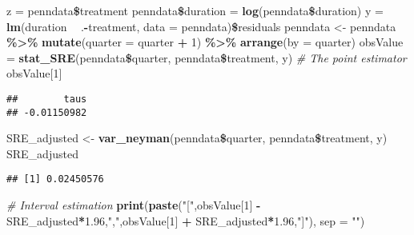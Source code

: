 \documentclass[]{article}
\newenvironment{Shaded}{\begin{snugshade}}{\end{snugshade}}
\newcommand{\KeywordTok}[1]{\textcolor[rgb]{0.13,0.29,0.53}{\textbf{#1}}}
\newcommand{\DataTypeTok}[1]{\textcolor[rgb]{0.13,0.29,0.53}{#1}}
\newcommand{\DecValTok}[1]{\textcolor[rgb]{0.00,0.00,0.81}{#1}}
\newcommand{\FloatTok}[1]{\textcolor[rgb]{0.00,0.00,0.81}{#1}}
\newcommand{\StringTok}[1]{\textcolor[rgb]{0.31,0.60,0.02}{#1}}
\newcommand{\CommentTok}[1]{\textcolor[rgb]{0.56,0.35,0.01}{\textit{#1}}}
\newcommand{\OperatorTok}[1]{\textcolor[rgb]{0.81,0.36,0.00}{\textbf{#1}}}
\newcommand{\NormalTok}[1]{#1}
\begin{document}
\begin{Shaded}
\begin{Highlighting}[]
\NormalTok{z =}\StringTok{ }\NormalTok{penndata}\OperatorTok{\$}\NormalTok{treatment}
\NormalTok{penndata}\OperatorTok{\$}\NormalTok{duration =}\StringTok{ }\KeywordTok{log}\NormalTok{(penndata}\OperatorTok{\$}\NormalTok{duration)}
\NormalTok{y =}\StringTok{ }\KeywordTok{lm}\NormalTok{(duration }\OperatorTok{~}\StringTok{ }\NormalTok{.}\OperatorTok{-}\NormalTok{treatment, }\DataTypeTok{data =}\NormalTok{ penndata)}\OperatorTok{\$}\NormalTok{residuals}
\NormalTok{penndata <-}\StringTok{ }\NormalTok{penndata }\OperatorTok{\%>\%}
\StringTok{  }\KeywordTok{mutate}\NormalTok{(}\DataTypeTok{quarter =}\NormalTok{ quarter }\OperatorTok{+}\StringTok{ }\DecValTok{1}\NormalTok{) }\OperatorTok{\%>\%}
\StringTok{  }\KeywordTok{arrange}\NormalTok{(}\DataTypeTok{by =}\NormalTok{ quarter)}
\NormalTok{obsValue =}\StringTok{ }\KeywordTok{stat_SRE}\NormalTok{(penndata}\OperatorTok{\$}\NormalTok{quarter, penndata}\OperatorTok{\$}\NormalTok{treatment, y)}
\CommentTok{# The point estimator}
\NormalTok{obsValue[}\DecValTok{1}\NormalTok{]}
\end{Highlighting}
\end{Shaded}

\begin{verbatim}
##        taus 
## -0.01150982
\end{verbatim}

\begin{Shaded}
\begin{Highlighting}[]
\NormalTok{SRE_adjusted <-}\StringTok{ }\KeywordTok{var_neyman}\NormalTok{(penndata}\OperatorTok{\$}\NormalTok{quarter, penndata}\OperatorTok{\$}\NormalTok{treatment, y)}
\NormalTok{SRE_adjusted}
\end{Highlighting}
\end{Shaded}

\begin{verbatim}
## [1] 0.02450576
\end{verbatim}

\begin{Shaded}
\begin{Highlighting}[]
\CommentTok{# Interval estimation}
\KeywordTok{print}\NormalTok{(}\KeywordTok{paste}\NormalTok{(}\StringTok{"["}\NormalTok{,obsValue[}\DecValTok{1}\NormalTok{] }\OperatorTok{-}\StringTok{ }\NormalTok{SRE_adjusted}\OperatorTok{*}\FloatTok{1.96}\NormalTok{,}\StringTok{","}\NormalTok{,obsValue[}\DecValTok{1}\NormalTok{] }\OperatorTok{+}\StringTok{ }\NormalTok{SRE_adjusted}\OperatorTok{*}\FloatTok{1.96}\NormalTok{,}\StringTok{"]"}\NormalTok{), }\DataTypeTok{sep =} \StringTok{""}\NormalTok{)}
\end{Highlighting}
\end{Shaded}
\end{document}
